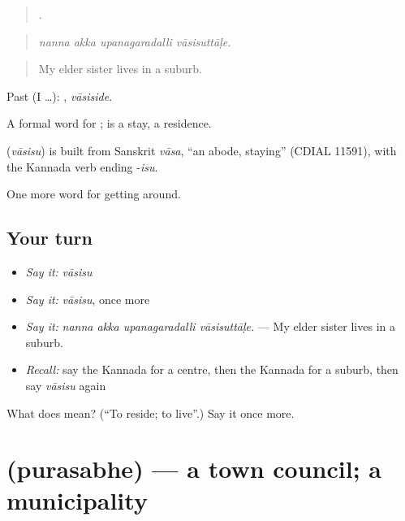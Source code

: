 \begin{quote}
   .
\end{quote}

\begin{quote}
\emph{nanna akka upanagaradalli vāsisuttāḷe.}
\end{quote}

\begin{quote}
My elder sister lives in a suburb.
\end{quote}

Past (I …): , \emph{vāsiside}.

A formal word for ;  is a stay, a residence.

\begin{cousinweb}
\textbf{} (\emph{vāsisu}) is built from Sanskrit \emph{vāsa}, \textquotedblleft{}an abode, staying\textquotedblright{} (CDIAL 11591), with the Kannada verb ending -\emph{isu}.
\end{cousinweb}

\begin{grammarlens}[title={What you've built}]
One more word for getting around.
\end{grammarlens}

\subsection*{Your turn}
\begin{itemize}
\raggedright
  \item \emph{Say it:} \emph{vāsisu}
  \item \emph{Say it:} \emph{vāsisu}, once more
  \item \emph{Say it:} \emph{nanna akka upanagaradalli vāsisuttāḷe.} — My elder sister lives in a suburb.
  \item \emph{Recall:} say the Kannada for a centre, then the Kannada for a suburb, then say \emph{vāsisu} again
\end{itemize}

\begin{tcolorbox}[breakable,colback=teal!4,colframe=teal!35!black,title={Before you move on}]
What does  mean? (\textquotedblleft{}To reside; to live\textquotedblright{}.) Say it once more.
\end{tcolorbox}
\section[\texorpdfstring{\kn{ಪುರಸಭೆ} (purasabhe)}{ಪುರಸಭೆ (purasabhe)}]{ (purasabhe) — a town council; a municipality}

